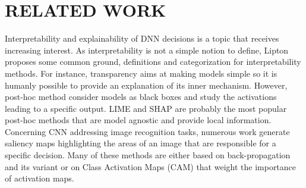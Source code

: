 \section{\uppercase{Related Work}}

Interpretability and explainability of DNN decisions is a topic that receives increasing interest.
As interpretability is not a simple notion to define, Lipton \cite{mythos_interp} proposes some common ground, definitions and categorization for interpretability methods.
For instance, transparency aims at making models simple so it is humanly possible to provide an explanation of its inner mechanism.
However, post-hoc method consider models as black boxes and study the activations leading to a specific output.
LIME \cite{LIME} and SHAP \cite{NIPS2017_7062} are probably the most popular post-hoc methods that are model agnostic and provide local information.
Concerning CNN addressing image recognition tasks, numerous work generate saliency maps highlighting the areas of an image that are responsible for a specific decision.
Many of these methods are either based on back-propagation and its variant or on Class Activation Maps (CAM) that weight the importance of activation maps.




